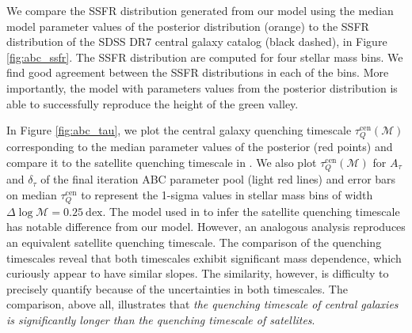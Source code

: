 \documentclass[iop,apj,tighten,twocolappendix,numberedappendix]{emulateapj}
\begin{document}
We compare the SSFR distribution generated from our model 
using the median model parameter values of the posterior 
distribution (orange) to the SSFR distribution of the SDSS 
DR7 central galaxy catalog (black dashed), in Figure 
\ref{fig:abc_ssfr}. The SSFR distribution are computed for 
four stellar mass bins. We find good agreement between the 
SSFR distributions in each of the bins. More importantly, 
the model with parameters values from the posterior distribution 
is able to successfully reproduce the height of the green valley.

In Figure \ref{fig:abc_tau}, we plot the central galaxy quenching timescale
$\tau^\mathrm{cen}_Q(\mathcal{M})$ corresponding to the median parameter 
values of the posterior (red points) and compare it to the satellite 
quenching timescale in \cite{Wetzel:2013aa}. We also plot 
$\tau^\mathrm{cen}_Q(\mathcal{M})$ for $A_\tau$ and $\delta_\tau$ of the 
final iteration ABC parameter pool (light red lines) and error bars on
median $\tau^\mathrm{cen}_Q$ to represent the 1-sigma values
in stellar mass bins of width $\Delta \log\mathcal{M} = 0.25~\mathrm{dex}$.
The model used in \cite{Wetzel:2013aa} to infer the satellite 
quenching timescale has notable difference from our model. However, 
an analogous analysis reproduces an equivalent satellite quenching timescale.
The comparison of the quenching timescales reveal that both timescales 
exhibit significant mass dependence, which curiously appear to have 
similar slopes. The similarity, however, is difficulty to precisely 
quantify because of the uncertainties in both timescales.
The comparison, above all, illustrates that {\em the quenching timescale 
of central galaxies is significantly longer than the quenching timescale 
of satellites}. 
\end{document}
